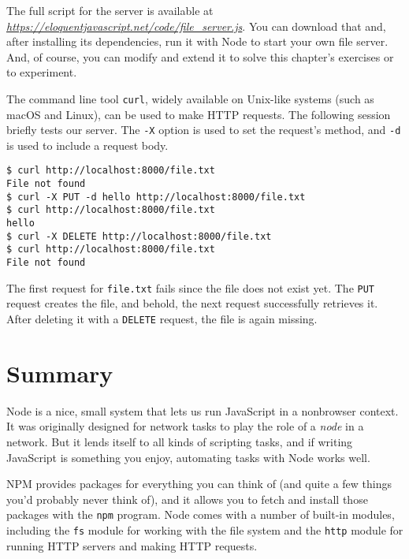 The full script for the server is available at \href{https://eloquentjavascript.net/code/file_server.js}{\emph{https://eloquentjavascript.net\slash code\slash file\_server.js}}. You can download that and, after installing its dependencies, run it with Node to start your own file server. And, of course, you can modify and extend it to solve this chapter's exercises or to experiment.

The command line tool \lstinline`curl`, widely available on Unix-like systems (such as macOS and Linux), can be used to make HTTP requests. The following session briefly tests our server. The \lstinline`-X` option is used to set the request's method, and \lstinline`-d` is used to include a request body.

\begin{lstlisting}
$ curl http://localhost:8000/file.txt
File not found
$ curl -X PUT -d hello http://localhost:8000/file.txt
$ curl http://localhost:8000/file.txt
hello
$ curl -X DELETE http://localhost:8000/file.txt
$ curl http://localhost:8000/file.txt
File not found
\end{lstlisting}
\noindent

The first request for \lstinline`file.txt` fails since the file does not exist yet. The \lstinline`PUT` request creates the file, and behold, the next request successfully retrieves it. After deleting it with a \lstinline`DELETE` request, the file is again missing.

\section{Summary}

Node is a nice, small system that lets us run JavaScript in a nonbrowser context. It was originally designed for network tasks to play the role of a \emph{node} in a network. But it lends itself to all kinds of scripting tasks, and if writing JavaScript is something you enjoy, automating tasks with Node works well.

NPM provides packages for everything you can think of (and quite a few things you'd probably never think of), and it allows you to fetch and install those packages with the \lstinline`npm` program. Node comes with a number of built-in modules, including the \lstinline`fs` module for working with the file system and the \lstinline`http` module for running HTTP servers and making HTTP requests.

